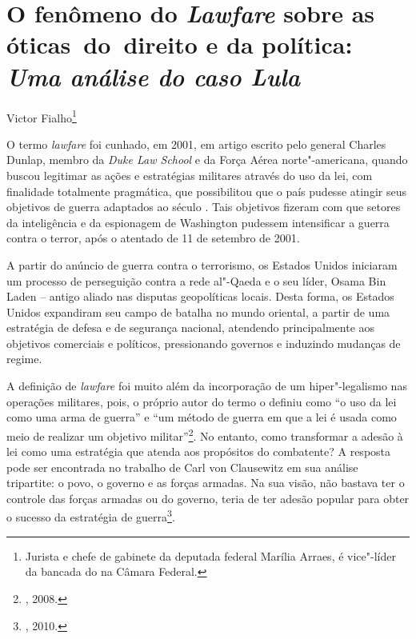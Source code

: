 \chapter*{O fenômeno do \emph{Lawfare} sobre as óticas~do~direito e da política:\\
\emph{Uma análise do caso Lula}}

\begin{flushright}
Victor Fialho\footnote{Jurista e chefe de gabinete da deputada federal Marília Arraes, é vice"-líder da bancada do  na Câmara Federal.}
\end{flushright}

O termo \emph{lawfare} foi cunhado, em 2001, em artigo escrito pelo
general Charles Dunlap, membro da \emph{Duke Law School} e da Força
Aérea norte"-americana, quando buscou legitimar as ações e estratégias
militares através do uso da lei, com finalidade totalmente pragmática,
que possibilitou que o país pudesse atingir seus objetivos de guerra
adaptados ao século . Tais objetivos fizeram com que setores da
inteligência e da espionagem de Washington pudessem intensificar a
guerra contra o terror, após o atentado de 11 de setembro de 2001.

A partir do anúncio de guerra contra o terrorismo, os Estados Unidos
iniciaram um processo de perseguição contra a rede al"-Qaeda e o seu
líder, Osama Bin Laden -- antigo aliado nas disputas geopolíticas locais.
Desta forma, os Estados Unidos expandiram seu campo de batalha no mundo
oriental, a partir de uma estratégia de defesa e de segurança nacional,
atendendo principalmente aos objetivos comerciais e políticos,
pressionando governos e induzindo mudanças de regime.

A definição de \emph{lawfare} foi muito além da incorporação de um
hiper"-legalismo nas operações militares, pois, o próprio autor do termo
o definiu como ``o uso da lei como uma arma de guerra'' e ``um método de
guerra em que a lei é usada como meio de realizar um objetivo militar''\footnote{, 2008.}. No entanto, como transformar a adesão à lei como uma
estratégia que atenda aos propósitos do combatente? A resposta pode ser
encontrada no trabalho de Carl von Clausewitz em sua análise tripartite:
o povo, o governo e as forças armadas. Na sua visão, não bastava ter o
controle das forças armadas ou do governo, teria de ter adesão popular
para obter o sucesso da estratégia de guerra\footnote{, 2010.}.

